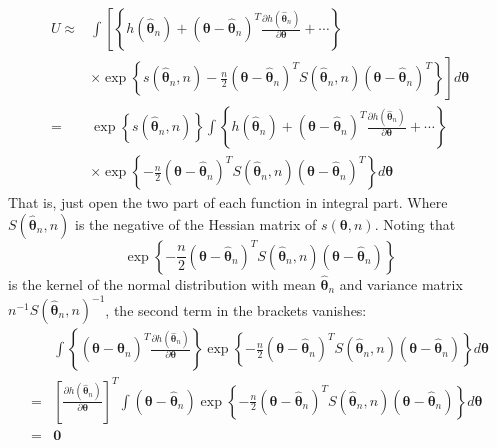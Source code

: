\documentclass[
]{book}
\theoremstyle{definition}
\theoremstyle{definition}
\theoremstyle{definition}
\theoremstyle{remark}
\begin{document}
\[
\begin{aligned} U \approx & \int\left[\left\{h\left(\hat{\boldsymbol{\theta}}_{n}\right)+\left(\boldsymbol{\theta}-\hat{\boldsymbol{\theta}}_{n}\right)^{T} \frac{\partial h\left(\hat{\boldsymbol{\theta}}_{n}\right)}{\partial \boldsymbol{\theta}}+\cdots\right\}\right.\\ &\left.\times \exp \left\{s\left(\hat{\boldsymbol{\theta}}_{n}, n\right)-\frac{n}{2}\left(\boldsymbol{\theta}-\hat{\boldsymbol{\theta}}_{n}\right)^{T} S\left(\hat{\boldsymbol{\theta}}_{n}, n\right)\left(\boldsymbol{\theta}-\hat{\boldsymbol{\theta}}_{n}\right)^{T}\right\}\right] d \boldsymbol{\theta} \\=& \exp \left\{s\left(\hat{\boldsymbol{\theta}}_{n}, n\right)\right\} \int\left\{h\left(\hat{\boldsymbol{\theta}}_{n}\right)+\left(\boldsymbol{\theta}-\hat{\boldsymbol{\theta}}_{n}\right)^{T} \frac{\partial h\left(\hat{\boldsymbol{\theta}}_{n}\right)}{\partial \boldsymbol{\theta}}+\cdots\right\} \\ & \times \exp \left\{-\frac{n}{2}\left(\boldsymbol{\theta}-\hat{\boldsymbol{\theta}}_{n}\right)^{T} S\left(\hat{\boldsymbol{\theta}}_{n}, n\right)\left(\boldsymbol{\theta}-\hat{\boldsymbol{\theta}}_{n}\right)^{T}\right\} d \boldsymbol{\theta} \end{aligned}
\]
That is, just open the two part of each function in integral part.
Where \(S\left(\hat{\boldsymbol{\theta}}_{n}, n\right)\) is the negative of the Hessian matrix of \(s(\boldsymbol{\theta}, n)\).
Noting that
\[
\exp \left\{-\frac{n}{2}\left(\boldsymbol{\theta}-\hat{\boldsymbol{\theta}}_{n}\right)^{T} S\left(\hat{\boldsymbol{\theta}}_{n}, n\right)\left(\boldsymbol{\theta}-\hat{\boldsymbol{\theta}}_{n}\right)\right\}
\]
is the kernel of the normal distribution with mean \(\hat{\boldsymbol \theta}_n\) and variance matrix \(n^{-1} S\left(\hat{\boldsymbol{\theta}}_{n}, n\right)^{-1}\), the second term in the brackets vanishes:
\[
\begin{aligned} & \int\left\{\left(\boldsymbol{\theta}-\hat{\boldsymbol{\theta}}_{n}\right)^{T} \frac{\partial h\left(\hat{\boldsymbol{\theta}}_{n}\right)}{\partial \boldsymbol{\theta}}\right\} \exp \left\{-\frac{n}{2}\left(\boldsymbol{\theta}-\hat{\boldsymbol{\theta}}_{n}\right)^{T} S\left(\hat{\boldsymbol{\theta}}_{n}, n\right)\left(\boldsymbol{\theta}-\hat{\boldsymbol{\theta}}_{n}\right)\right\} d \boldsymbol{\theta} \\=&\left[\frac{\partial h\left(\hat{\boldsymbol{\theta}}_{n}\right)}{\partial \boldsymbol{\theta}}\right]^{T} \int\left(\boldsymbol{\theta}-\hat{\boldsymbol{\theta}}_{n}\right) \exp \left\{-\frac{n}{2}\left(\boldsymbol{\theta}-\hat{\boldsymbol{\theta}}_{n}\right)^{T} S\left(\hat{\boldsymbol{\theta}}_{n}, n\right)\left(\boldsymbol{\theta}-\hat{\boldsymbol{\theta}}_{n}\right)\right\} d \boldsymbol{\theta} \\=& \mathbf{0} \end{aligned}
\]
\end{document}
